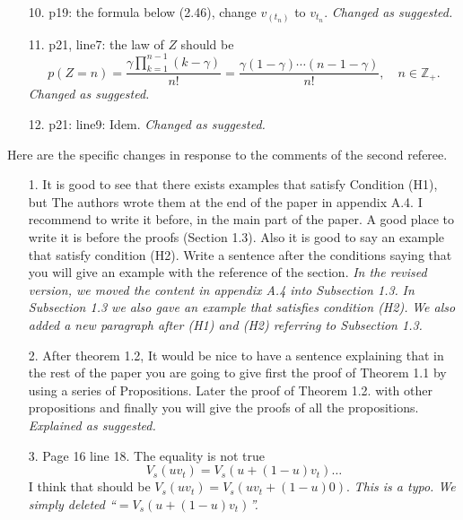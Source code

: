 \documentclass[12pt,a4paper]{amsart}
\begin{document}
\begin{itemize}
	{\it Recalled as suggested.}
\\
\item[10.]
	p19: the formula below (2.46), change $v_{(t_n)}$ to $v_{t_n}$.
	{\it Changed as suggested.}
\\
\item[11.]
	p21, line7: the law of $Z$ should be
\[
	p(Z = n) = \frac{\gamma\prod_{k=1}^{n-1}(k-\gamma)}{n!}
	=\frac{\gamma(1-\gamma)\cdots (n-1-\gamma)}{n!},
	\quad n\in\mathbb Z_+.
\]
	{\it Changed as suggested.}
\\
\item[12.]
	p21: line9: Idem.
	{\it Changed as suggested.}
\\
\end{itemize}

	Here are the specific changes in response to the comments of the second referee.
\begin{itemize}
\item [1.]
	It is good to see that there exists examples that satisfy Condition (H1), but The authors wrote them at the end of the paper in appendix A.4. I recommend to write it before, in the main part of the paper. A good place to write it is before the proofs (Section 1.3).	
	Also it is good to say an example that satisfy condition (H2).
	Write a sentence after the conditions saying that you will give an example with the reference of the section.
	{\it In the revised version, we moved the content in appendix A.4 into Subsection 1.3. }
 {\it In Subsection 1.3 we also gave an example that satisfies condition (H2).}
	{\it We also added a new paragraph after (H1) and (H2) referring to Subsection 1.3.}
\\
\item[2.]
	After theorem 1.2, It would be nice to have a sentence explaining that in the rest of the paper you are going to give first the proof of Theorem 1.1 by using a series of Propositions. Later the proof of Theorem 1.2. with other propositions and finally you will give the proofs of all the propositions.
	{\it Explained as suggested.}
\\
\item[3.]
	Page 16 line 18. The equality is not true
\[
	V_s(uv_t) = V_s(u+(1-u)v_t) \dots
\]
	I think that should be $V_s(uv_t) = V_s(uv_t + (1-u)0).$	
   {\it This is a typo. We simply deleted ``$=V_s(u+(1-u)v_t)$''.}
\\
\end{itemize}
\end{document}
